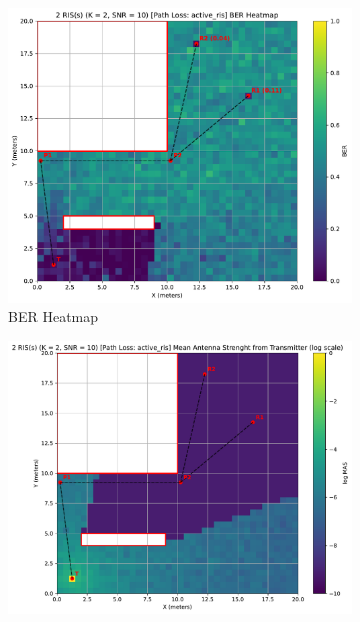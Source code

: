 \begin{figure}[H]
  \centering
  \begin{subfigure}[b]{0.48\textwidth}
    \centering
    \includegraphics[width=\textwidth]{imgs/heatmap-simulations/2 RIS(s) (K = 2, SNR = 10) [Path Loss: active_ris] BER Heatmap.pdf}
    \caption{BER Heatmap}
  \end{subfigure}
  \hfill
  \begin{subfigure}[b]{0.48\textwidth}
    \centering
    \includegraphics[width=\textwidth]{imgs/heatmap-simulations/2 RIS(s) (K = 2, SNR = 10) [Path Loss: active_ris] Mean Antenna Strenght from Transmitter (log scale).pdf}

\end{subfigure}
\end{figure}
